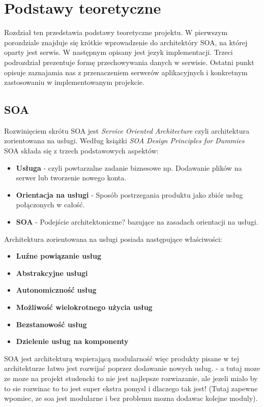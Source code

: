 \chapter{Podstawy teoretyczne}
\label{cha:podstawyTeoretyczne}
Rozdział ten przedstawia podstawy teoretyczne projektu. W pierwszym porozdziale znajduje się krótkie wprowadzenie do architektóry SOA, na której oparty jest serwis. W następnym opisany jest jezyk implementacji. Trzeci podrozdział prezentuje formę przechowywania danych w serwisie. Ostatni punkt opisuje zaznajamia nas z przenaczeniem serwerów aplikacyjnych i konkretnym zastosowaniu w implementowanym projekcie.


\section{SOA}
\label{sec:soa}

Rozwinięciem skrótu SOA jest \textit{Service Oriented Architecture} czyli architektura zorientowana na usługi. Według książki \textit{SOA Design Principles for Dummies} SOA składa się z trzech podstawowych aspektów:
\begin{itemize}
	\item \textbf{Usługa} - czyli powtarzalne zadanie biznesowe np. Dodawanie plików na serwer lub tworzenie nowego konta.
	\item \textbf{Orientacja na usługi} - Sposób postrzegania produktu jako zbiór usług połączonych w całość.
	\item \textbf{SOA} - Podejście architektoniczne? bazujące na zasadach orientacji na usługi.
\end{itemize}
Architektura zorientowana na usługi posiada następujące właściwości:
\begin{itemize}
	\item \textbf{Luźne powiązanie usług}
	\item \textbf{Abstrakcyjne usługi}
	\item \textbf{Autonomiczność usług}
	\item \textbf{Możliwość wielokrotnego użycia usług}
	\item \textbf{Bezstanowość usług}
	\item \textbf{Dzielenie usług na komponenty}
\end{itemize}
\cite{SOA13}
SOA jest architekturą wspierającą modularność więc produkty pisane w tej architekturze łatwo jest rozwijać poprzez dodawanie nowych usług. \newline
- a tutaj moze ze moze na projekt studencki to nie jest najlepsze rozwiazanie, ale jezeli mialo by to sie rozwinac to to jest super ekstra pomysl i dlaczego tak jest! (Tutaj zapewne wpomiec, ze soa jest modularne i bez problemu mozna dodawac kolejne moduly).\newline

